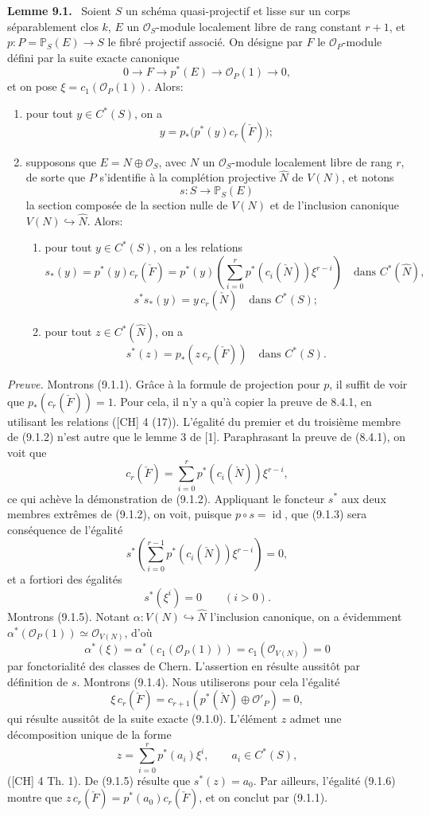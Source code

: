 \documentclass[11pt]{article}
\newenvironment{statement}[1]{\par\medskip\noindent\textbf{#1.}\ }{\par\medskip}
\begin{document}
\begin{statement}{Lemme 9.1}
Soient $S$ un schéma quasi-projectif et lisse sur un corps séparablement clos $k$, $E$ un $\mathcal O_S$-module localement libre de rang constant $r+1$, et $p:P=\mathbb P_S(E)\to S$ le fibré projectif associé. On désigne par $F$ le $\mathcal O_P$-module défini par la suite exacte canonique
\[
0\to F\to p^*(E)\to\mathcal O_P(1)\to0,
\tag{9.1.0}
\]
et on pose $\xi=c_1(\mathcal O_P(1))$. Alors:
\begin{enumerate}[label=(\roman*)]
\item pour tout $y\in C^*(S)$, on a
\[
y=p_*\bigl(p^*(y)c_r(\check F)\bigr);
\tag{9.1.1}
\]
\item supposons que $E=N\oplus\mathcal O_S$, avec $N$ un $\mathcal O_S$-module localement libre de rang $r$, de sorte que $P$ s'identifie à la complétion projective $\widehat N$ de $V(N)$, et notons
\[
s:S\to\mathbb P_S(E)
\]
la section composée de la section nulle de $V(N)$ et de l'inclusion canonique $V(N)\hookrightarrow\widehat N$. Alors:
\begin{enumerate}[label=(\alph*)]
\item pour tout $y\in C^*(S)$, on a les relations
\[
s_*(y)=p^*(y)c_r(\check F)=p^*(y)\left(\sum_{i=0}^r p^*(c_i(\check N))\xi^{r-i}\right)
\quad\text{dans }C^*(\widehat N),
\tag{9.1.2}
\]
\[
s^*s_*(y)=y\,c_r(\check N)\quad\text{dans }C^*(S);
\tag{9.1.3}
\]
\item pour tout $z\in C^*(\widehat N)$, on a
\[
s^*(z)=p_*(z\,c_r(\check F))\quad\text{dans }C^*(S).
\tag{9.1.4}
\]
\end{enumerate}
\end{enumerate}
\end{statement}

\emph{Preuve.} Montrons (9.1.1). Grâce à la formule de projection pour $p$, il suffit de voir que $p_*(c_r(\check F))=1$. Pour cela, il n'y a qu'à copier la preuve de 8.4.1, en utilisant les relations ([CH] 4 (17)). L'égalité du premier et du troisième membre de (9.1.2) n'est autre que le lemme 3 de [1]. Paraphrasant la preuve de (8.4.1), on voit que
\[
c_r(\check F)=\sum_{i=0}^r p^*(c_i(\check N))\xi^{r-i},
\tag{9.1.2 bis}
\]
ce qui achève la démonstration de (9.1.2). Appliquant le foncteur $s^*$ aux deux membres extrêmes de (9.1.2), on voit, puisque $p\circ s=\operatorname{id}$, que (9.1.3) sera conséquence de l'égalité
\[
s^*\left(\sum_{i=0}^{r-1}p^*(c_i(\check N))\xi^{r-i}\right)=0,
\]
et a fortiori des égalités
\[
s^*(\xi^i)=0\qquad(i>0).
\tag{9.1.5}
\]
Montrons (9.1.5). Notant $\alpha:V(N)\hookrightarrow\widehat N$ l'inclusion canonique, on a évidemment $\alpha^*(\mathcal O_P(1))\simeq\mathcal O_{V(N)}$, d'où
\[
\alpha^*(\xi)=\alpha^*(c_1(\mathcal O_P(1)))=c_1(\mathcal O_{V(N)})=0
\]
par fonctorialité des classes de Chern. L'assertion en résulte aussitôt par définition de $s$. Montrons (9.1.4). Nous utiliserons pour cela l'égalité
\[
\xi\,c_r(\check F)=c_{r+1}(p^*(\check N)\oplus\mathcal O'_P)=0,
\tag{9.1.6}
\]
qui résulte aussitôt de la suite exacte (9.1.0). L'élément $z$ admet une décomposition unique de la forme
\[
z=\sum_{i=0}^r p^*(a_i)\xi^i,\qquad a_i\in C^*(S),
\]
([CH] 4 Th. 1). De (9.1.5) résulte que $s^*(z)=a_0$. Par ailleurs, l'égalité (9.1.6) montre que $z\,c_r(\check F)=p^*(a_0)c_r(\check F)$, et on conclut par (9.1.1).
\end{document}
